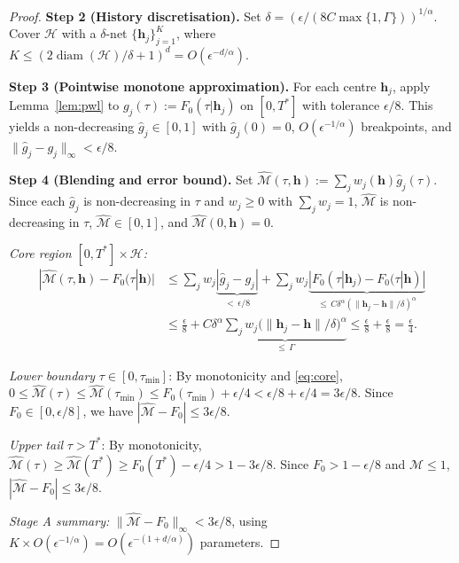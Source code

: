 \begin{proof}
\textbf{Step 2 (History discretisation).}
Set $\delta = (\epsilon / (8C\max\{1,\Gamma\}))^{1/\alpha}$.
Cover $\mathcal{H}$ with a $\delta$-net $\{\boldsymbol{h}_j\}_{j=1}^K$,
where $K \leq (2\operatorname{diam}(\mathcal{H})/\delta+1)^d = O(\epsilon^{-d/\alpha})$.

\textbf{Step 3 (Pointwise monotone approximation).}
For each centre $\boldsymbol{h}_j$, apply Lemma~\ref{lem:pwl} to
$g_j(\tau) := F_0(\tau|\boldsymbol{h}_j)$ on $[0,T^*]$ with tolerance $\epsilon/8$.
This yields a non-decreasing $\hat{g}_j \in [0,1]$ with $\hat{g}_j(0)=0$,
$O(\epsilon^{-1/\alpha})$ breakpoints, and
$\|\hat{g}_j - g_j\|_{\infty} < \epsilon/8$.

\textbf{Step 4 (Blending and error bound).}
Set $\hat{\mathcal{M}}(\tau,\boldsymbol{h}) := \sum_j w_j(\boldsymbol{h})\hat{g}_j(\tau)$.
Since each $\hat{g}_j$ is non-decreasing in $\tau$ and $w_j \geq 0$ with $\sum_j w_j = 1$,
$\hat{\mathcal{M}}$ is non-decreasing in $\tau$,
$\hat{\mathcal{M}} \in [0,1]$, and $\hat{\mathcal{M}}(0,\boldsymbol{h})=0$.

\emph{Core region $[0,T^*]\times\mathcal{H}$:}
\begin{align}
|\hat{\mathcal{M}}(\tau,\boldsymbol{h}) - F_0(\tau|\boldsymbol{h})|
&\leq \sum_j w_j\underbrace{|\hat{g}_j - g_j|}_{<\,\epsilon/8}
  + \sum_j w_j\underbrace{|F_0(\tau|\boldsymbol{h}_j) - F_0(\tau|\boldsymbol{h})|}_{\leq\, C\delta^\alpha(\|\boldsymbol{h}_j-\boldsymbol{h}\|/\delta)^\alpha}
\nonumber\\
&\leq \frac{\epsilon}{8} + C\delta^\alpha\underbrace{\sum_j w_j
  \bigl(\|\boldsymbol{h}_j-\boldsymbol{h}\|/\delta\bigr)^\alpha}_{\leq\,\Gamma}
\leq \frac{\epsilon}{8} + \frac{\epsilon}{8} = \frac{\epsilon}{4}. \label{eq:core}
\end{align}

\emph{Lower boundary} $\tau \in [0,\tau_{\min}]$:
By monotonicity and \eqref{eq:core}, $0 \leq \hat{\mathcal{M}}(\tau) \leq
\hat{\mathcal{M}}(\tau_{\min}) \leq F_0(\tau_{\min}) + \epsilon/4 < \epsilon/8 + \epsilon/4 = 3\epsilon/8$.
Since $F_0 \in [0, \epsilon/8]$, we have $|\hat{\mathcal{M}} - F_0| \leq 3\epsilon/8$.

\emph{Upper tail} $\tau > T^*$:
By monotonicity, $\hat{\mathcal{M}}(\tau) \geq \hat{\mathcal{M}}(T^*)
\geq F_0(T^*) - \epsilon/4 > 1 - 3\epsilon/8$.
Since $F_0 > 1 - \epsilon/8$ and $\hat{\mathcal{M}} \leq 1$,
$|\hat{\mathcal{M}} - F_0| \leq 3\epsilon/8$.

\smallskip
\emph{Stage A summary:}
$\|\hat{\mathcal{M}} - F_0\|_\infty < 3\epsilon/8$,
using $K \times O(\epsilon^{-1/\alpha}) = O(\epsilon^{-(1+d/\alpha)})$ parameters.


\end{proof}
